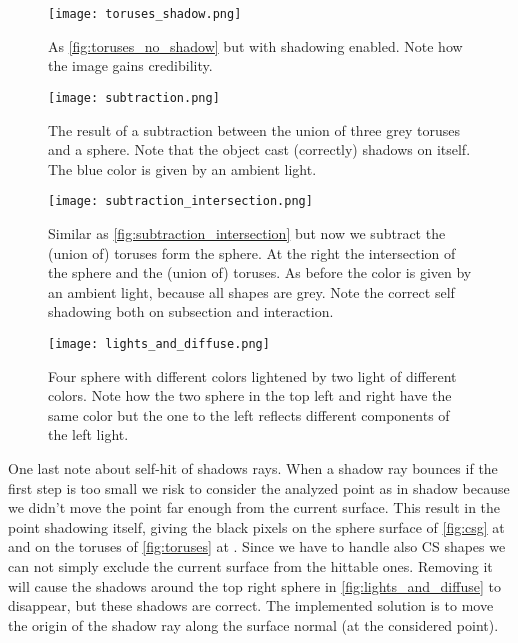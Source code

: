 \begin{figure}[!htb]
  \centering
  \texttt{[image: toruses\_shadow.png]}
  \caption{As \autoref{fig:toruses_no_shadow} but with shadowing enabled. Note how the image gains credibility.}
  \label{fig:toruses_shadow}
\end{figure}

\clearpage

\begin{figure}[!htb]
  \centering
  \texttt{[image: subtraction.png]}
  \caption{The result of a subtraction between the union of three grey toruses and a sphere.
    Note that the object cast (correctly) shadows on itself.
    The blue color is given by an ambient light.
  }
  \label{fig:subtraction_3D}
\end{figure}


\begin{figure}[!htb]
  \centering
  \texttt{[image: subtraction\_intersection.png]}
  \caption{
    Similar as \autoref{fig:subtraction_intersection} but now we subtract the (union of) toruses form the sphere.
    At the right the intersection of the sphere and the (union of) toruses.
    As before the color is given by an ambient light, because all shapes are grey.
    Note the correct self shadowing both on subsection and interaction.
  }
  \label{fig:subtraction_intersection}
\end{figure}

\clearpage
\begin{figure}[!htb]
  \centering
  \texttt{[image: lights\_and\_diffuse.png]}
  \caption{
    Four sphere with different colors lightened by two light of different colors.
    Note how the two sphere in the top left and right have the same color but the one to the left reflects different components of the left light.
  }
  \label{fig:lights_and_diffuse}
\end{figure}

One last note about self-hit of shadows rays.
When a shadow ray bounces if the first step is too small we risk to consider the analyzed point as in shadow because we didn't move the point far enough from the current surface.
This result in the point shadowing itself, giving the black pixels on the sphere surface of \autoref{fig:csg} at  and on the toruses of \autoref{fig:toruses} at .
Since we have to handle also CS shapes we can not simply exclude the current surface from the hittable ones.
Removing it will cause the shadows around the top right sphere in \autoref{fig:lights_and_diffuse} to disappear, but these shadows are correct.
The implemented solution is to move the origin of the shadow ray along the surface normal (at the considered point).
